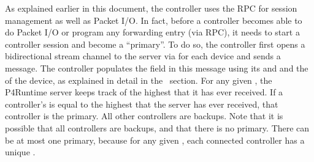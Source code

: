 \documentclass[11pt]{article}
\begin{document}
{%
As explained earlier in this document, the controller uses the 
RPC for session management as well as Packet I/O. In fact, before a controller
becomes able to do Packet I/O or program any forwarding entry (via  RPC),
it needs to start a controller session and become a \textquotedblleft{}primary\textquotedblright{}. To do so, the
controller first opens a bidirectional stream channel to the server via
 for each device and sends a  message. The
controller populates the  field in this message using
its  and  and the  of the device, as explained
in detail in the~
section. For any given , the P4Runtime server keeps track
of the highest  that it has ever received. If a controller's
 is equal to the highest  that the server has ever
received, that controller is the primary. All other controllers are backups.
Note that it is possible that all controllers are backups, and that there is no
primary. There can be at most one primary, because for any given
, each connected controller has a unique .%

}
\end{document}
